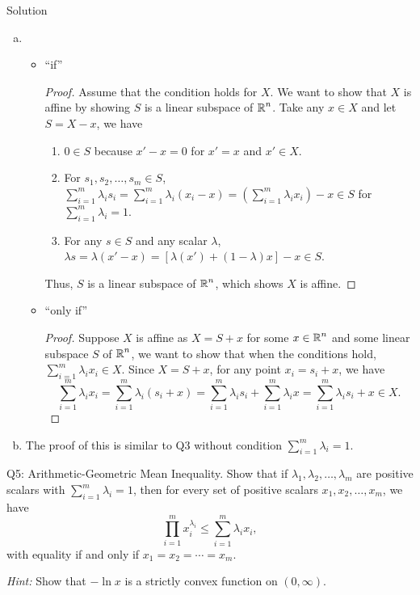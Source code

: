 \documentclass{article}
\begin{document}
\begin{solution}
    {Solution}
    \begin{enumerate}[(a)]
        \item {
            \begin{itemize}
                \item ``if'' {
                    \begin{proof}
                        Assume that the condition holds for $X$. We want to show that $X$ is affine by showing $S$ is a linear subspace of $\operatorname{\mathbb{R}}^n$. Take any $x\in X$ and let $S=X-x$, we have
                        \begin{enumerate}[(1)]
                            \item $0\in S$ because $x'-x=0$ for $x'=x$ and $x'\in X$.
                            \item For $s_1, s_2,\ldots,s_m\in S$, $\sum_{i=1}^{m}\lambda_i s_i=\sum_{i=1}^{m}\lambda_i(x_i-x)=(\sum_{i=1}^{m}\lambda_i x_i)-x\in S$ for $\sum_{i=1}^{m}\lambda_i=1$.
                            \item For any $s\in S$ and any scalar $\lambda$, $\lambda s=\lambda(x'-x)=[\lambda(x')+(1-\lambda)x]-x\in S$.
                        \end{enumerate}
                        Thus, $S$ is a linear subspace of $\operatorname{\mathbb{R}}^n$, which shows $X$ is affine.
                    \end{proof}
                }
                \item ``only if'' {
                    \begin{proof}
                        Suppose $X$ is affine as $X=S+x$ for some $x\in\operatorname{\mathbb{R}}^n$ and some linear subspace $S$ of $\operatorname{\mathbb{R}}^n$, we want to show that when the conditions hold, $\sum_{i=1}^{m}\lambda_i x_i\in X$. Since $X=S+x$, for any point $x_i=s_i+x$, we have
                        \[
                            \sum_{i=1}^{m}\lambda_i x_i=\sum_{i=1}^{m}\lambda_i(s_i+x)=\sum_{i=1}^{m}\lambda_i s_i+\sum_{i=1}^{m}\lambda_i x=\sum_{i=1}^{m}\lambda_i s_i+x\in X.
                        \]
                    \end{proof}
                }
            \end{itemize}
        }
        \item The proof of this is similar to Q3 without condition $\sum_{i=1}^{m}\lambda_i=1$.
    \end{enumerate}
\end{solution}

\begin{problem}
    {Q5: Arithmetic-Geometric Mean Inequality.}
    Show that if $\lambda_1, \lambda_2, \ldots, \lambda_m$ are positive scalars with $\sum_{i=1}^{m}\lambda_i=1$, then for every set of positive scalars $x_1, x_2, \ldots, x_m$, we have
    \[
        \prod_{i=1}^{m}x_i^{\lambda_i}\leq\sum_{i=1}^{m}\lambda_ix_i,
    \]
    with equality if and only if $x_1=x_2=\cdots=x_m$.

    \textit{Hint:} Show that $-\ln x$ is a strictly convex function on $(0,\infty)$.
\end{problem}
\end{document}
